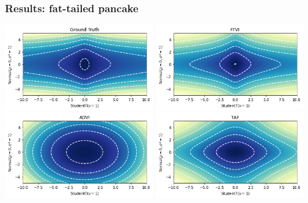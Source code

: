 \documentclass{beamer}
\begin{document}
\begin{frame}
    \frametitle{Results: fat-tailed pancake}

    \begin{center}
        \includegraphics[width=0.48\textwidth]{../Figures/pancake-truth.png}
        \includegraphics[width=0.48\textwidth]{../Figures/pancake-ftvi.png}
        \includegraphics[width=0.48\textwidth]{../Figures/pancake-advi.png}
        \includegraphics[width=0.48\textwidth]{../Figures/pancake-taf.png}
    \end{center}
\end{frame}
\end{document}
